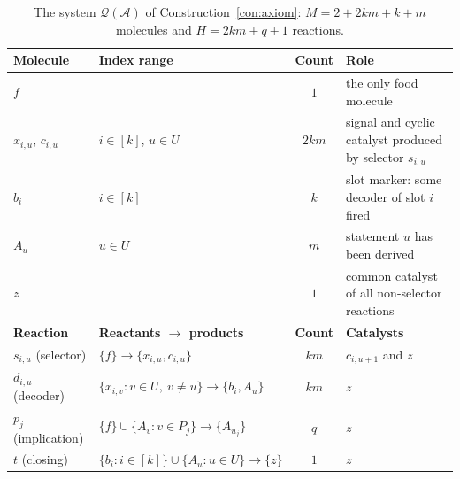 \documentclass[11pt,a4paper]{article}
\theoremstyle{plain}
\theoremstyle{definition}
\theoremstyle{remark}
\newcommand{\cA}{\mathcal{A}}
\newcommand{\cQ}{\mathcal{Q}}
\begin{document}
\begin{table}[t]
\centering
\footnotesize
\begin{tabular}{@{}llcp{4.6cm}@{}}
\toprule
\textbf{Molecule} & \textbf{Index range} & \textbf{Count} & \textbf{Role}\\
\midrule
$f$ & & $1$ & the only food molecule\\
$x_{i,u}$, $c_{i,u}$ & $i\in[k]$, $u\in U$ & $2km$ & signal and cyclic catalyst produced by selector $s_{i,u}$\\
$b_i$ & $i\in[k]$ & $k$ & slot marker: some decoder of slot $i$ fired\\
$A_u$ & $u\in U$ & $m$ & statement $u$ has been derived\\
$z$ & & $1$ & common catalyst of all non-selector reactions\\
\midrule
\textbf{Reaction} & \textbf{Reactants $\to$ products} & \textbf{Count} & \textbf{Catalysts}\\
\midrule
$s_{i,u}$ (selector) & $\{f\}\to\{x_{i,u},c_{i,u}\}$ & $km$ & $c_{i,u+1}$ and $z$\\
$d_{i,u}$ (decoder) & $\{x_{i,v}: v\in U,\ v\neq u\}\to\{b_i,A_u\}$ & $km$ & $z$\\
$p_j$ (implication) & $\{f\}\cup\{A_v: v\in P_j\}\to\{A_{u_j}\}$ & $q$ & $z$\\
$t$ (closing) & $\{b_i: i\in[k]\}\cup\{A_u: u\in U\}\to\{z\}$ & $1$ & $z$\\
\bottomrule
\end{tabular}
\caption{The system $\cQ(\cA)$ of Construction~\ref{con:axiom}: $M=2+2km+k+m$ molecules and $H=2km+q+1$ reactions.}
\label{tab:construction}
\end{table}
\end{document}
